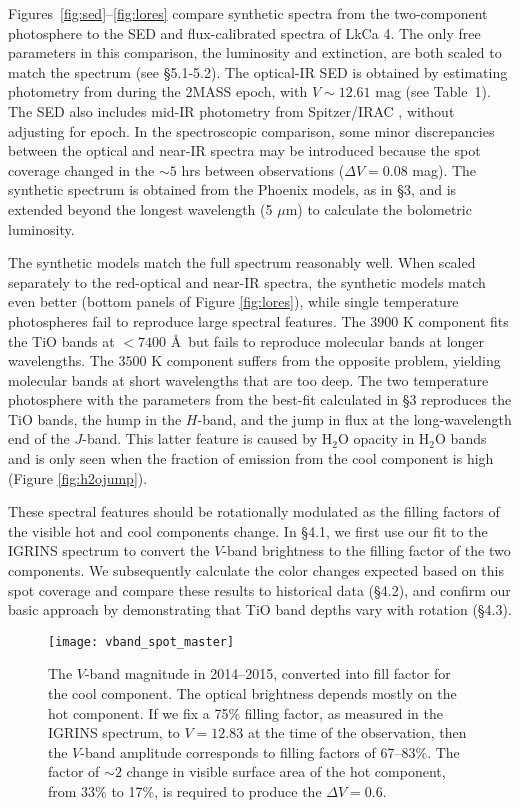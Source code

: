 \documentclass[twocolumn]{emulateapj}%
\begin{document}
Figures~\ref{fig:sed}--\ref{fig:lores} compare synthetic spectra from the two-component photosphere to the SED and flux-calibrated spectra of LkCa 4.  The only free parameters in this comparison, the luminosity and extinction, are both scaled to match the spectrum (see \S 5.1-5.2).  The optical-IR SED is obtained by estimating photometry from \citet{grankin08} during the 2MASS epoch, with $V\sim12.61$ mag (see Table~1).  The SED also includes mid-IR photometry from Spitzer/IRAC \citep{hartmann05}, without adjusting for epoch.  In the spectroscopic comparison, some minor discrepancies between the optical and near-IR spectra may be introduced because the spot coverage changed in the $\sim 5$ hrs between observations ($\Delta V=0.08$ mag).  The synthetic spectrum is obtained from the Phoenix models, as in \S 3, and is extended beyond the longest wavelength (5 $\mu$m) to calculate the bolometric luminosity.

The synthetic models match the full spectrum reasonably well.  When scaled separately to the red-optical and near-IR spectra, the synthetic models match even better (bottom panels of Figure \ref{fig:lores}), while single temperature photospheres fail to reproduce large spectral features.   The $3900$ K component fits the TiO bands at $<7400$ \AA\ but fails to reproduce molecular bands at longer wavelengths.  The $3500$ K component suffers from the opposite problem, yielding molecular bands at short wavelengths that are too deep.  The two temperature photosphere with the parameters from the best-fit calculated in \S 3 reproduces the TiO bands, the hump in the $H$-band, and the jump in flux at the long-wavelength end of the $J$-band.  This latter feature is caused by H$_2$O opacity in H$_2$O bands and is only seen when the fraction of emission from the cool component is high (Figure \ref{fig:h2ojump}).

These spectral features should be rotationally modulated as the filling factors of the visible hot and cool components change.    In \S 4.1, we first use our fit to the IGRINS spectrum to convert the $V$-band brightness to the filling factor of the two components.  We subsequently calculate the color changes expected based on this spot coverage and compare these results to historical data (\S 4.2), and confirm our basic approach by demonstrating that TiO band depths vary with rotation (\S 4.3).



\begin{figure*}
 \centering
 \texttt{[image: vband\_spot\_master]}
\caption{The $V$-band magnitude in 2014--2015, converted into fill factor for the cool component.  The optical brightness depends mostly on the hot component.  If we fix a 75\% filling factor, as measured in the IGRINS spectrum, to $V=12.83$ at the time of the observation, then the $V$-band amplitude  corresponds to filling factors of 67--83\%.  The factor of $\sim 2$ change in visible surface area of the hot component, from 33\% to 17\%, is required to produce the $\Delta V=0.6$. }
\label{fig:vband_spot}
\end{figure*}
\end{document}
